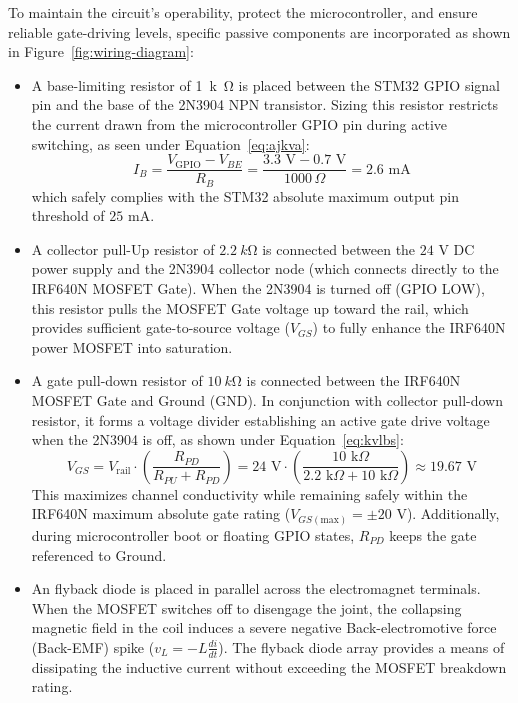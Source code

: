 To maintain the circuit's operability, protect the microcontroller, and ensure reliable gate-driving levels, specific passive components are incorporated as shown in Figure~\ref{fig:wiring-diagram}:
\begin{itemize}
	\item A base-limiting resistor of \SI{1}{k\ohm} is placed between the STM32 GPIO signal pin and the base of the 2N3904 NPN transistor. Sizing this resistor restricts the current drawn from the microcontroller GPIO pin during active switching, as seen under Equation~\ref{eq:ajkva}:
	\begin{equation}
		\label{eq:ajkva}
		I_B = \frac{V_{\text{GPIO}} - V_{BE}}{R_B} = \frac{3.3\text{ V} - 0.7\text{ V}}{1000\,\Omega} = 2.6\text{ mA}
	\end{equation}
	which safely complies with the STM32 absolute maximum output pin threshold of $25\text{ mA}$.
	\item A collector pull-Up resistor of $\SI{2.2}{k\ohm}$ is connected between the $24\text{ V}$ DC power supply and the 2N3904 collector node (which connects directly to the IRF640N MOSFET Gate). When the 2N3904 is turned off (GPIO LOW), this resistor pulls the MOSFET Gate voltage up toward the rail, which provides sufficient gate-to-source voltage ($V_{GS}$) to fully enhance the IRF640N power MOSFET into saturation.
	\item A gate pull-down resistor of $\SI{10}{k\ohm}$ is connected between the IRF640N MOSFET Gate and Ground (GND). In conjunction with collector pull-down resistor, it forms a voltage divider establishing an active gate drive voltage when the 2N3904 is off, as shown under Equation~\ref{eq:kvlbs}:
	\begin{equation}
		\label{eq:kvlbs}
		V_{GS} = V_{\text{rail}} \cdot \left( \frac{R_{PD}}{R_{PU} + R_{PD}} \right) = 24\text{ V} \cdot \left( \frac{10\text{ k}\Omega}{2.2\text{ k}\Omega + 10\text{ k}\Omega} \right) \approx 19.67\text{ V}
	\end{equation}
	This maximizes channel conductivity while remaining safely within the IRF640N maximum absolute gate rating ($V_{GS(\text{max})} = \pm 20\text{ V}$). Additionally, during microcontroller boot or floating GPIO states, $R_{PD}$ keeps the gate referenced to Ground.
	\item An flyback diode is placed in parallel across the electromagnet terminals. When the MOSFET switches off to disengage the joint, the collapsing magnetic field in the coil induces a severe negative Back-electromotive force (Back-EMF) spike ($v_L = -L \frac{di}{dt}$). The flyback diode array provides a means of dissipating the inductive current without exceeding the MOSFET breakdown rating.
\end{itemize}

